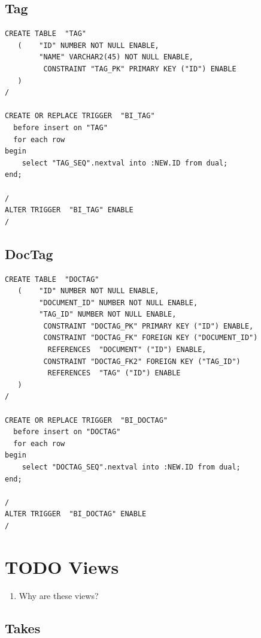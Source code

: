\documentclass[11pt]{article}
\begin{document}
\subsection{Tag}
\label{sec-4-9}



\begin{verbatim}
CREATE TABLE  "TAG" 
   (    "ID" NUMBER NOT NULL ENABLE, 
        "NAME" VARCHAR2(45) NOT NULL ENABLE, 
         CONSTRAINT "TAG_PK" PRIMARY KEY ("ID") ENABLE
   )
/

CREATE OR REPLACE TRIGGER  "BI_TAG" 
  before insert on "TAG"               
  for each row  
begin   
    select "TAG_SEQ".nextval into :NEW.ID from dual; 
end; 

/
ALTER TRIGGER  "BI_TAG" ENABLE
/
\end{verbatim}
\subsection{DocTag}
\label{sec-4-10}



\begin{verbatim}
CREATE TABLE  "DOCTAG" 
   (    "ID" NUMBER NOT NULL ENABLE, 
        "DOCUMENT_ID" NUMBER NOT NULL ENABLE, 
        "TAG_ID" NUMBER NOT NULL ENABLE, 
         CONSTRAINT "DOCTAG_PK" PRIMARY KEY ("ID") ENABLE, 
         CONSTRAINT "DOCTAG_FK" FOREIGN KEY ("DOCUMENT_ID")
          REFERENCES  "DOCUMENT" ("ID") ENABLE, 
         CONSTRAINT "DOCTAG_FK2" FOREIGN KEY ("TAG_ID")
          REFERENCES  "TAG" ("ID") ENABLE
   )
/

CREATE OR REPLACE TRIGGER  "BI_DOCTAG" 
  before insert on "DOCTAG"               
  for each row  
begin   
    select "DOCTAG_SEQ".nextval into :NEW.ID from dual; 
end; 

/
ALTER TRIGGER  "BI_DOCTAG" ENABLE
/
\end{verbatim}
\section{\textbf{TODO} Views}
\label{sec-5}


\begin{enumerate}
\item Why are these views?
\end{enumerate}
\subsection{Takes}
\label{sec-5-1}
\end{document}
